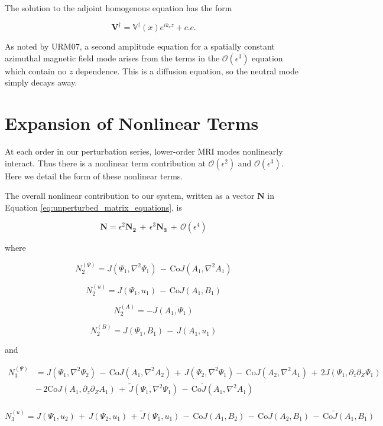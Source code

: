 \documentclass[twocolumn]{aastex61}
\newcommand{\beq}{\begin{equation}}
\newcommand{\eeq}{\end{equation}}
\newcommand{\Co}{\mathrm{Co}}
\begin{document}
The solution to the adjoint homogenous equation has the form 

\beq
\mathbf{V^\dagger} = \mathbb{V}^\dagger(x) e^{i k_c z} + c.c.
\eeq

As noted by URM07, a second amplitude equation for a spatially constant azimuthal magnetic field mode arises from the terms in the $\mathcal{O}(\epsilon^3)$ equation which contain no $z$ dependence. This is a diffusion equation, so the neutral mode simply decays away.

\section{Expansion of Nonlinear Terms}\label{app:nonlinear_terms}

At each order in our perturbation series, lower-order MRI modes nonlinearly interact. Thus there is a nonlinear term contribution at $\mathcal{O}(\epsilon^2)$ and $\mathcal{O}(\epsilon^3)$. Here we detail the form of these nonlinear terms. 

The overall nonlinear contribution to our system, written as a vector $\mathbf{N}$ in Equation \ref{eq:unperturbed_matrix_equations}, is

\beq
\mathbf{N} = \epsilon^2\mathbf{N_2} \, + \, \epsilon^3\mathbf{N_3} \, + \, \mathcal{O}(\epsilon^4)
\eeq

where

\beq
N_2^{(\Psi)} = J(\Psi_1, \nabla^2 \Psi_1) \,-\, \Co J(A_1, \nabla^2 A_1) 
\eeq

\beq
N_2^{(u)} = J(\Psi_1, u_1) \, - \, \Co J(A_1, B_1) 
\eeq

\beq
N_2^{(A)} = - J(A_1, \Psi_1) 
\eeq

\beq
N_2^{(B)} =  J(\Psi_1, B_1) \, - \, J(A_1, u_1)
\eeq

and

\beq
\begin{split}
N_3^{(\Psi)} & = J(\Psi_1, \nabla^2\Psi_2) \, - \, \Co J(A_1, \nabla^2 A_2) \,+\, J(\Psi_2, \nabla^2\Psi_1) - \, \Co J(A_2, \nabla^2 A_1) \,+\, 2 J(\Psi_1, \partial_z\partial_Z \Psi_1) \, \\
& - \, 2 \Co J(A_1, \partial_z\partial_Z A_1) \,+\, \widetilde{J}(\Psi_1, \nabla^2 \Psi_1) \, - \,  \Co \widetilde{J}(A_1, \nabla^2 A_1)\\
\end{split}
\eeq

\beq
N_3^{(u)} = J(\Psi_1, u_2) \, + \, J(\Psi_2, u_1) \, + \, \widetilde{J}(\Psi_1, u_1) \, - \, \Co J(A_1, B_2) \, - \, \Co J(A_2, B_1) \, - \, \Co \widetilde{J}(A_1, B_1)
\eeq
\end{document}
